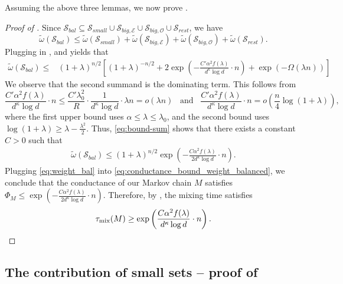 \documentclass[reqno,a4paper,11pt]{amsart}
\newcommand{\cE}{\mathcal{E}}
\newcommand{\cO}{\mathcal{O}}
\newcommand{\cS}{\mathcal{S}}
\newcommand{\lam}{\lambda}
\newcommand{\tmix}{\tau_{\rm{mix}}}
\newcommand{\ex}{\kappa}
\begin{document}
Assuming the above three lemmas, we now prove .
\begin{proof}[Proof of ]
Since $\cS_{bal} \subseteq \cS_{small} \cup \cS_{big, \cE} \cup \cS_{big, \cO} \cup \cS_{rest}$, we have 
    \[
    \tilde{\omega}(\cS_{bal}) \leq \tilde{\omega}(\cS_{small}) + \tilde{\omega}(\cS_{big, \cE}) + \tilde{\omega}(\cS_{big, \cO}) + \tilde{\omega}(\cS_{rest}).
    \]
    Plugging in ,  and  yields that
    \begin{align} \label{eq:bound-sum}
        \tilde{\omega}(\cS_{bal}) \leq &(1+\lambda)^{n/2}\left[(1+\lam)^{-n/2}+2\exp\left( - \frac{C' \alpha^2 f(\lam)}{d^{\ex}\log d} \cdot n\right)+\exp(-\Omega(\lam n))\right]
        \end{align}
    We observe that the second summand is the dominating term.
    This follows from
    \[
    \frac{C' \alpha^2 f(\lam)}{d^{\ex}\log d} \cdot n \leq \frac{C' \lam_0^2}{R} \cdot \frac{1 }{d^{\ex}\log d} \cdot \lam n = o(\lam n) \hspace{10pt} \text{and} \hspace{10pt} \frac{C' \alpha^2 f(\lam)}{d^{\ex}\log d} \cdot n = o\left(\frac{n}{4} \log(1+\lam)\right),
    \]
    where the first upper bound uses $\alpha \leq \lam \leq \lam_0$, and the second bound uses $\log(1+\lambda) \geq \lam - \frac{\lam^2}{2}$. Thus, \eqref{eq:bound-sum} shows that there exists a constant $C > 0$ such that 
    \begin{align} \label{eq:weight_bal}
        \tilde{\omega}(\cS_{bal}) \leq (1+\lambda)^{n/2} \exp\left( - \frac{C \alpha^2 f(\lam) }{2 d^{\ex}\log d} \cdot n\right).
    \end{align}
    Plugging \eqref{eq:weight_bal} into \eqref{eq:conductance_bound_weight_balanced}, we conclude that the conductance of our Markov chain $M$ satisfies $\Phi_M \leq  \exp\left( - \frac{C \alpha^2 f(\lam)}{2 d^{\ex} \log d} \cdot n \right)$. Therefore, by , the mixing time satisfies
    \[
    \tmix(M) \geq \exp\left( \frac{C \alpha^2 f(\lam)}{d^{\ex}\log d} \cdot n \right). \qedhere
    \]
\end{proof}

\subsection{The contribution of small sets -- proof of } \label{sec:small}
\end{document}
